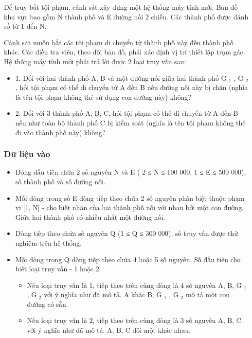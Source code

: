 



   Để truy bắt tội phạm, cảnh sát xây dựng một hệ thống máy tính mới. Bản đồ khu vực bao gồm N thành phố và E đường nối 2 chiều. Các thành phố được đánh số từ 1 đến N.  

   Cảnh sát muốn bắt các tội phạm di chuyển từ thành phố này đến thành phố khác. Các điều tra viên, theo dõi bản đồ, phải xác định vị trí thiết lập trạm gác. Hệ thống máy tính mới phải trả lời được 2 loại   truy vấn sau:  
\begin{itemize}
	\item     1. Đối với hai thành phố A, B và một đường nối giữa hai thành phố G    $_     1    $    , G    $_     2    $    , hỏi tội phạm có thể di chuyển từ A đến B nếu đường nối này bị chặn (nghĩa là tên tội phạm không   thể sử dụng con đường này) không?   
	\item     2. Đối với 3 thành phố A, B, C, hỏi tội phạm có thể di chuyển từ A đến B nếu như toàn bộ thành phố C bị kiểm soát (nghĩa là tên tội phạm không thể đi vào thành phố này) không?   
\end{itemize}

\subsubsection{   Dữ liệu vào  }
\begin{itemize}
	\item     Dòng đầu tiên chứa 2 số nguyên N và E ( 2 ≤ N ≤ 100 000, 1 ≤ E ≤ 500 000), số thành phố và số đường nối.   
	\item     Mỗi dòng trong số E dòng tiếp theo chứa 2 số nguyên phân biệt thuộc phạm vi [1, N] - cho biết nhãn của hai thành phố nối với nhau bởi một con đường. Giữa hai thành phố có nhiều nhất một đường nối.   
	\item     Dòng tiếp theo chứa số nguyên Q (1 ≤ Q ≤ 300 000), số truy vấn được thử nghiệm trên hệ thống.   
	\item     Mỗi dòng trong Q dòng tiếp theo chứa 4 hoặc 5 số nguyên. Số đầu tiên cho biết loại truy vấn - 1 hoặc 2.    
\begin{itemize}
	\item       Nếu loại truy vấn là 1, tiếp theo trên cùng dòng là 4 số nguyên A, B, G      $_       1      $      , G      $_       2      $      với ý nghĩa như đã mô tả. A khác B; G      $_       1      $      , G      $_       2      $      mô tả một con đường có   sẵn.     
	\item       Nếu loại truy vấn là 2, tiếp theo trên cùng dòng là 3 số nguyên A, B, C với ý nghĩa như đã mô tả. A, B, C đôi một khác nhau.     
\end{itemize}
\end{itemize}

